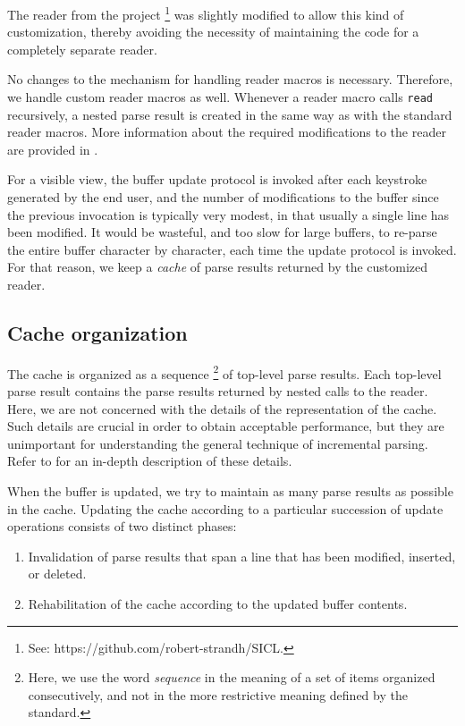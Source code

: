 The reader from the \sicl{} project%
\footnote{See: https://github.com/robert-strandh/SICL.}  was slightly
modified to allow this kind of customization, thereby avoiding the
necessity of maintaining the code for a completely separate reader.

No changes to the mechanism for handling reader macros is necessary.
Therefore, we handle custom reader macros as well.  Whenever a reader
macro calls \texttt{read} recursively, a nested parse result is
created in the same way as with the standard reader macros.  More
information about the required modifications to the reader are
provided in .

For a visible view, the buffer update protocol is invoked after each
keystroke generated by the end user, and the number of modifications
to the buffer since the previous invocation is typically very modest,
in that usually a single line has been modified.  It would be
wasteful, and too slow for large buffers, to re-parse the entire
buffer character by character, each time the update protocol is
invoked.  For that reason, we keep a \emph{cache} of parse results
returned by the customized reader.

\subsection{Cache organization}

The cache is organized as a sequence%
\footnote{Here, we use the word \emph{sequence} in the meaning of a
  set of items organized consecutively, and not in the more
  restrictive meaning defined by the \commonlisp{} standard.}  of
top-level parse results.  Each top-level parse result contains the
parse results returned by nested calls to the reader.  Here, we are
not concerned with the details of the representation of the cache.
Such details are crucial in order to obtain acceptable performance,
but they are unimportant for understanding the general technique of
incremental parsing.  Refer to  for an
in-depth description of these details.

When the buffer is updated, we try to maintain as many parse results
as possible in the cache.  Updating the cache according to a
particular succession of update operations consists of two distinct
phases:

\begin{enumerate}
\item Invalidation of parse results that span a line that has been
  modified, inserted, or deleted.
\item Rehabilitation of the cache according to the updated buffer
  contents.
\end{enumerate}

